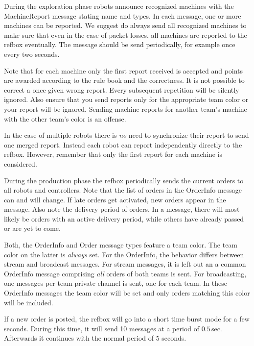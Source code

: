 \documentclass[a4paper]{article}
\begin{document}
%
{%
  During the exploration phase robots announce recognized machines
  with the MachineReport message stating name and types. In each
  message, one or more machines can be reported. We suggest do always
  send all recognized machines to make sure that even in the case of
  packet losses, all machines are reported to the refbox
  eventually. The message should be send periodically, for example
  once every two seconds.

  \medskip

  Note that for each machine only the first report received is
  accepted and points are awarded according to the rule book and the
  correctness. It is not possible to correct a once given wrong
  report. Every subsequent repetition will be silently ignored. Also
  ensure that you send reports only for the appropriate team color or
  your report will be ignored. Sending machine reports for another
  team's machine with the other team's color is an offense.

  \medskip

  In the case of multiple robots there is \emph{no} need to
  synchronize their report to send one merged report. Instead each
  robot can report independently directly to the refbox. However,
  remember that only the first report for each machine is considered.

}

%
{%
  During the production phase the refbox periodically sends the
  current orders to all robots and controllers. Note that the list of
  orders in the OrderInfo message can and will change. If late orders
  get activated, new orders appear in the message. Also note the
  delivery period of orders. In a message, there will most likely be
  orders with an active delivery period, while others have already
  passed or are yet to come.

  \medskip

  Both, the OrderInfo and Order message types feature a team
  color. The team color on the latter is \emph{always} set. For the
  OrderInfo, the behavior differs between stream and broadcast
  messages. For stream messages, it is left out an a common OrderInfo
  message comprising \emph{all} orders of both teams is sent. For
  broadcasting, one messages per team-private channel is sent, one for
  each team. In these OrderInfo messages the team color will be set
  and only orders matching this color will be included.

  \medskip

  If a new order is posted, the refbox will go into a short time burst
  mode for a few seconds. During this time, it will send 10 messages
  at a period of $0.5$\,sec. Afterwards it continues with the normal
  period of $5$ seconds.
}
\end{document}
